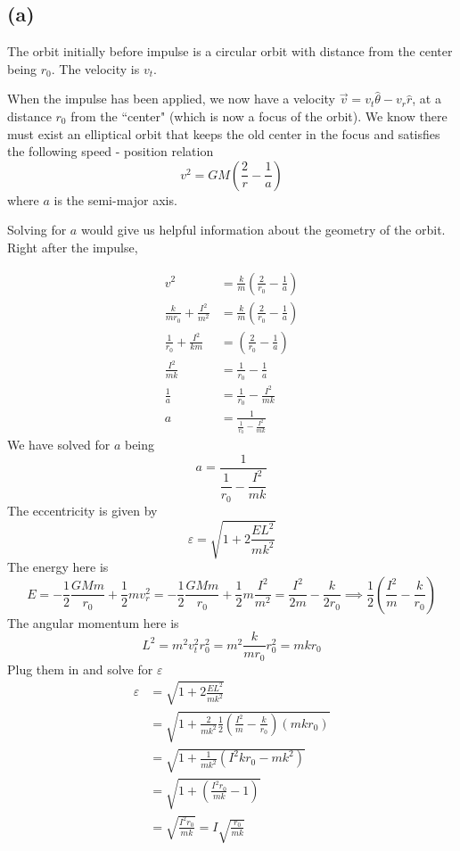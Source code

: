 \documentclass[letter, 10pts]{article}
\begin{document}
\subsection*{(a)} 
The orbit initially before impulse is a circular orbit with distance from the center being $r_0$. The velocity is $v_t$. 

When the impulse has been applied, we now have a velocity $\vec{v} = v_t \hat{\theta} - v_r \hat{r}$, at a distance $r_0$ from the ``center" (which is now a focus of the orbit). We know there must exist an elliptical orbit that keeps the old center in the focus and satisfies the following speed - position relation 
\[
v^2 = GM \left(\frac{2}{r} - \frac{1}{a}\right)
\] where $a$ is the semi-major axis. 

Solving for $a$ would give us helpful information about the geometry of the orbit. Right after the impulse, 

\begin{align*}
	v^2 &= \frac{k}{m}\left(\frac{2}{r_0} - \frac{1}{a}\right) \\ 
	\frac{k}{mr_0} + \frac{I^2}{m^2} &= \frac{k}{m} \left(\frac{2}{r_0} - \frac{1}{a}\right)
	\\
	\frac{1}{r_0} + \frac{I^2}{k m} &=  \left(\frac{2}{r_0} - \frac{1}{a}\right) 
	\\
	\frac{I^2}{m k} &= \frac{1}{r_0} - \frac{1}{a}
\\ 	
\frac{1}{a} &= \frac{1}{r_0} - \frac{I^2}{  m k } \\
a &= \frac{1}{ \frac{1}{r_0} - \frac{I^2}{m k}}
\end{align*}
We have solved for $a$ being
\[
a = \frac{1}{ \dfrac{1}{r_0} - \dfrac{I^2}{m k}}
\] 
The eccentricity is given by 
\[
\varepsilon = 
\sqrt{1 + 2 \frac{E L^2}{m k ^2}} 
\]
The energy here is 
\[E = 
	- \frac{1}{2} \frac{GM m }{r_0} + \frac{1}{2}m v_r^2 = 
	- \frac{1}{2} \frac{GM m }{r_0} + \frac{1}{2}m \frac{I^2}{m^2} 
= \frac{I^2}{2m}- \frac{k}{2 r_0} 
\implies \frac{1}{2} \left(\frac{I^2}{m}- \frac{k}{ r_0} \right)
\] 
The angular momentum here is 
\[
L^2 = m^2 v_t^2 r_0^2 = m^2 \frac{k}{m r_0} r_0^2 = m k r_0
\] 
Plug them in and solve for $\varepsilon$
\begin{align*}
	\varepsilon &= 
\sqrt{1 + 2 \frac{E L^2}{m k ^2}}  \\ 
&= \sqrt{1 + \frac{2}{m k  ^2} \frac{1}{2} \left(\frac{I^2}{m} - \frac{k}{r_0} \right) \left( m k  r_0\right)}   \\
&= \sqrt{1 + \frac{1}{m k  ^2}  \left({I^2}k r_0 -  m k^2  \right) }  \\
&= \sqrt{1 +   \left(\frac{I^2 r_0}{m k}-  1  \right)  } \\
&= \sqrt{\frac{I^2 r_0}{m k}  }  = 
I \sqrt{\frac{r_0}{ m k}} 
\end{align*}
\end{document}
